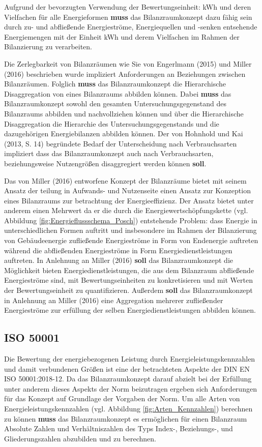 Aufgrund der bevorzugten Verwendung der Bewertungseinheit: kWh und deren Vielfachen für alle Energieformen \textbf{muss} das Bilanzraumkonzept dazu fähig sein 
durch zu- und abfließende Energieströme, Energiequellen und -senken entsehende Energiemengen mit der Einheit kWh und derem Vielfachen im Rahmen der Bilanzierung zu 
verarbeiten.

Die Zerlegbarkeit von Bilanzräumen wie Sie von Engerlmann (2015) und Miller (2016) beschrieben wurde impliziert Anforderungen an Beziehungen zwischen Bilanzräumen.
Folglich \textbf{muss} das Bilanzraumkonzept die Hierarchische Disaggregation von eines Bilanzraums abbilden können.
Dabei \textbf{muss} das Bilanzraumkonzept sowohl den gesamten Untersuchungsgegenstand des Bilanzraums abbilden und nachvollziehen können und 
über die Hierarchische Disaggregation die Hierarchie des Untersuchungsgegenstands und die dazugehörigen Energiebilanzen abbilden können. 
Der von Hohnhold und Kai (2013, S. 14) begründete Bedarf der Unterscheidung nach Verbrauchsarten impliziert dass das Bilanzraumkonzept auch 
nach Verbrauchsarten, beziehungsweise Nutzengrößen disaggregiert werden können \textbf{soll}.

Das von Miller (2016) entworfene Konzept der Bilanzräume bietet mit seinem Ansatz der teilung in Aufwands- und Nutzenseite einen Ansatz zur Konzeption eines Bilanzraums 
zur betrachtung der Energieeffizienz.
Der Ansatz bietet unter anderem einen Mehrwert da er die durch die Energiewertschöpfungskette (vgl. Abbildung \eqref{fig:Energieflussschema_Posch}) entstehende Problem:
dass Energie in unterschiedlichen Formen auftritt und insbesondere im Rahmen der Bilanzierung von Gebäudeenergie zufließende Energieströme in Form von Endenergie auftreten 
während die abfließenden Energieströme in Form Energiedienstleistungen auftreten.
In Anlehnung an Miller (2016) \textbf{soll} das Bilanzraumkonzept die Möglichkeit bieten Energiedienstleistungen, die aus dem Bilanzraum abfließende Energieströme sind, 
mit Bewertungseinheiten zu konkretisieren und mit Werten der Bewertungseinheit zu quantifizieren. 
Außerdem \textbf{soll} das Bilanzraumkonzept in Anlehnung an Miller (2016) eine Aggregation mehrerer zufließender Energieströme zur erfüllung der selben Energiedienstleistungen 
abbilden können.

\subsection{ISO 50001}

Die Bewertung der energiebezogenen Leistung durch Energieleistungskennzahlen und damit verbundenen Größen ist eine der betrachteten Aspekte der DIN EN ISO 50001:2018-12.
Da das Bilanzraumkonzept darauf abzielt bei der Erfüllung unter anderem dieses Aspekts der Norm beizutragen ergeben sich Anforderungen für das Konzept auf Grundlage der 
Vorgaben der Norm.
Um alle Arten von Energieleistungskennzahlen (vgl. Abbildung \eqref{fig:Arten_Kennzahlen}) berechnen zu können \textbf{muss} das Bilanzraumkonzept es ermöglichen für 
einen Bilanzraum Absolute Zahlen und Verhältniszahlen des Typs Index-, Beziehungs-, und Gliederungszahlen abzubilden und zu berechnen.

